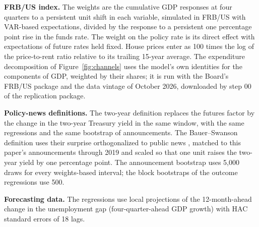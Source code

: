 \documentclass[11pt]{article}
\begin{document}
\begin{appendices}
\textbf{FRB/US index.} The weights are the cumulative GDP responses at four quarters to a persistent unit shift in each variable, simulated in FRB/US with VAR-based expectations, divided by the response to a persistent one percentage point rise in the funds rate. The weight on the policy rate is its direct effect with expectations of future rates held fixed. House prices enter as 100 times the log of the price-to-rent ratio relative to its trailing 15-year average. The expenditure decomposition of Figure~\ref{fig:channels} uses the model's own identities for the components of GDP, weighted by their shares; it is run with the Board's FRB/US package and the data vintage of October 2026, downloaded by step 00 of the replication package.

\textbf{Policy-news definitions.} The two-year definition replaces the futures factor by the change in the two-year Treasury yield in the same window, with the same regressions and the same bootstrap of announcements. The Bauer--Swanson definition uses their surprise orthogonalized to public news \citep{bauer2023}, matched to this paper's announcements through 2019 and scaled so that one unit raises the two-year yield by one percentage point. The announcement bootstrap uses 5,000 draws for every weights-based interval; the block bootstraps of the outcome regressions use 500.

\textbf{Forecasting data.} The regressions use local projections of the 12-month-ahead change in the unemployment gap (four-quarter-ahead GDP growth) with HAC standard errors of 18 lags.


\end{appendices}
\end{document}
